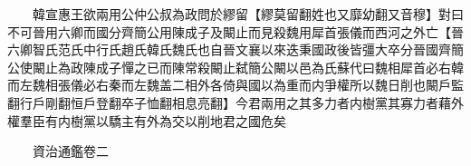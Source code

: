 　　韓宣惠王欲兩用公仲公叔為政問於繆留【繆莫留翻姓也又靡幼翻又音穆】對曰不可晉用六卿而國分齊簡公用陳成子及闞止而見殺魏用犀首張儀而西河之外亡【晉六卿智氏范氏中行氏趙氏韓氏魏氏也自晉文襄以來迭秉國政後皆彊大卒分晉國齊簡公使闞止為政陳成子憚之已而陳常殺闞止弑簡公闞以邑為氏蘇代曰魏相犀首必右韓而左魏相張儀必右秦而左魏盖二相外各倚與國以為重而内爭權所以魏日削也闞戶監翻行戶剛翻恒戶登翻卒子恤翻相息亮翻】今君兩用之其多力者内樹黨其寡力者藉外權羣臣有内樹黨以驕主有外為交以削地君之國危矣

　　資治通鑑卷二


    


 


 



 

 
  







 


　　
　　
　
　
　


　　

　















	
	









































 
  



















 





 












  
  
  

 





